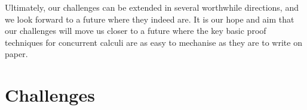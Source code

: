 \documentclass[runningheads]{llncs}
\begin{document}
Ultimately, our challenges can be extended in several worthwhile directions, and we look forward to a future where they indeed are.
It is our hope and aim that our challenges will move us closer to a future where the key basic proof techniques for concurrent calculi are as easy to mechanise as they are to write on paper.




\clearpage
\appendix
\section{Challenges}\label{app:challenges}

\end{document}
